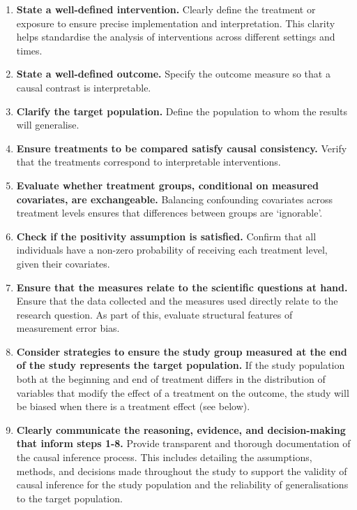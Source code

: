 \documentclass[
  single column]{article}
\begin{document}
\begin{enumerate}
\def\labelenumi{\arabic{enumi}.}
\item
  \textbf{State a well-defined intervention.} Clearly define the
  treatment or exposure to ensure precise implementation and
  interpretation. This clarity helps standardise the analysis of
  interventions across different settings and times.
\item
  \textbf{State a well-defined outcome.} Specify the outcome measure so
  that a causal contrast is interpretable.
\item
  \textbf{Clarify the target population.} Define the population to whom
  the results will generalise.
\item
  \textbf{Ensure treatments to be compared satisfy causal consistency.}
  Verify that the treatments correspond to interpretable interventions.
\item
  \textbf{Evaluate whether treatment groups, conditional on measured
  covariates, are exchangeable.} Balancing confounding covariates across
  treatment levels ensures that differences between groups are
  `ignorable'.
\item
  \textbf{Check if the positivity assumption is satisfied.} Confirm that
  all individuals have a non-zero probability of receiving each
  treatment level, given their covariates.
\item
  \textbf{Ensure that the measures relate to the scientific questions at
  hand.} Ensure that the data collected and the measures used directly
  relate to the research question. As part of this, evaluate structural
  features of measurement error bias.
\item
  \textbf{Consider strategies to ensure the study group measured at the
  end of the study represents the target population.} If the study
  population both at the beginning and end of treatment differs in the
  distribution of variables that modify the effect of a treatment on the
  outcome, the study will be biased when there is a treatment effect
  (see below).
\item
  \textbf{Clearly communicate the reasoning, evidence, and
  decision-making that inform steps 1-8.} Provide transparent and
  thorough documentation of the causal inference process. This includes
  detailing the assumptions, methods, and decisions made throughout the
  study to support the validity of causal inference for the study
  population and the reliability of generalisations to the target
  population.
\end{enumerate}
\end{document}
